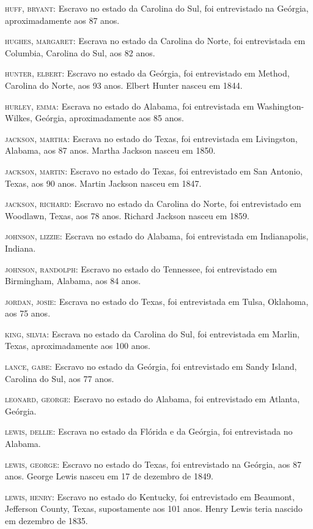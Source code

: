\begin{Parskip}
\textsc{huff, bryant:} Escravo no estado da Carolina do Sul, foi
entrevistado na Geórgia, aproximadamente aos 87 anos.

\textsc{hughes, margaret:} Escrava no estado da Carolina do Norte, foi
entrevistada em Columbia, Carolina do Sul, aos 82 anos.

\textsc{hunter, elbert:} Escravo no estado da Geórgia, foi entrevistado
em Method, Carolina do Norte, aos 93 anos. Elbert Hunter nasceu em 1844.

\textsc{hurley, emma:} Escrava no estado do Alabama, foi entrevistada em
Washington-Wilkes, Geórgia, aproximadamente aos 85 anos.

\textsc{jackson, martha:} Escrava no estado do Texas, foi entrevistada
em Livingston, Alabama, aos 87 anos. Martha Jackson nasceu em 1850.

\textsc{jackson, martin:} Escravo no estado do Texas, foi entrevistado
em San Antonio, Texas, aos 90 anos. Martin Jackson nasceu em 1847.

\textsc{jackson, richard:} Escravo no estado da Carolina do Norte, foi
entrevistado em Woodlawn, Texas, aos 78 anos. Richard Jackson nasceu em
1859.

\textsc{johnson, lizzie:} Escrava no estado do Alabama, foi entrevistada
em Indianapolis, Indiana.

\textsc{johnson, randolph:} Escravo no estado do Tennessee, foi
entrevistado em Birmingham, Alabama, aos 84 anos.

\textsc{jordan, josie:} Escrava no estado do Texas, foi entrevistada em
Tulsa, Oklahoma, aos 75 anos.

\textsc{king, silvia:} Escrava no estado da Carolina do Sul, foi
entrevistada em Marlin, Texas, aproximadamente aos 100 anos.

\textsc{lance, gabe:} Escravo no estado da Geórgia, foi entrevistado em
Sandy Island, Carolina do Sul, aos 77 anos.

\textsc{leonard, george:} Escravo no estado do Alabama, foi entrevistado
em Atlanta, Geórgia.

\textsc{lewis, dellie:} Escrava no estado da Flórida e da Geórgia, foi
entrevistada no Alabama.

\textsc{lewis, george:} Escravo no estado do Texas, foi entrevistado na
Geórgia, aos 87 anos. George Lewis nasceu em 17 de dezembro de 1849.

\textsc{lewis, henry:} Escravo no estado do Kentucky, foi entrevistado
em Beaumont, Jefferson County, Texas, supostamente aos 101 anos. Henry
Lewis teria nascido em dezembro de 1835.


\end{Parskip}
